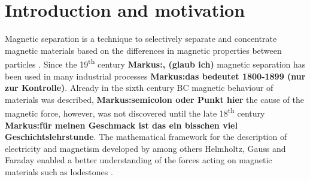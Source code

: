 
\chapter{Introduction and motivation}
\label{ch:Introduction}
Magnetic separation is a technique to selectively separate and concentrate magnetic materials based on the differences in magnetic properties between particles \cite{ge2017magnetic}. Since the 19\textsuperscript{th} century \textbf{Markus:, (glaub ich)} magnetic separation has been used in many industrial processes \textbf{Markus:das bedeutet 1800-1899 (nur zur Kontrolle)}. Already in the sixth century BC magnetic behaviour of materials was described, \textbf{Markus:semicolon oder Punkt hier} the cause of the magnetic force, however, was not discovered until the late 18\textsuperscript{th} century \cite{livingston1996driving}\textbf{Markus:für meinen Geschmack ist das ein bisschen viel Geschichtslehrstunde}. The mathematical framework for the description of electricity and magnetism developed by among others Helmholtz, Gauss and Faraday enabled a better understanding of the forces acting on magnetic materials such as lodestones \cite{yavuz2009magnetic}. 

